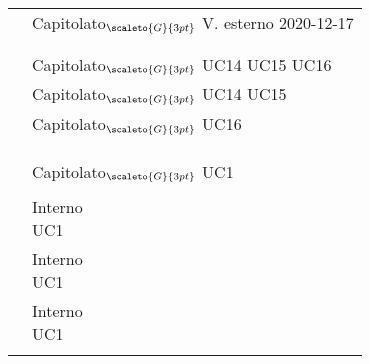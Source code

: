 {{{{\def\tabularxcolumn#1{m{#1}}
{
	\begin{center}
		\renewcommand{\arraystretch}{1.4}
		\begin{longtable}{|p{7.5cm}|p{7.5cm}|}
		\hline
		\rowcolor{airforceblue}
		\makecell[tc]{\textbf{Codice RS}} & \makecell[c]{\textbf{Fonte}}  \\
		\hline
		\makecell[tc]{RSFO1} & \makecell[tc]{Capitolato$_{\scaleto{G}{3pt}}$\\V. esterno 2020-12-17} \\
		\hline
		\makecell[tc]{RSFF2} & \makecell[tc]{Capitolato$_{\scaleto{G}{3pt}}$}\\
		\hline
		\makecell[tc]{RSFO3} & \makecell[tc]{UC2}\\
		\hline
		\makecell[tc]{RSFO4} & \makecell[tc]{Capitolato$_{\scaleto{G}{3pt}}$\\UC14\\UC15\\ UC16}\\
		\hline
		\makecell[tc]{RSFO4.1} & \makecell[tc]{Capitolato$_{\scaleto{G}{3pt}}$\\UC14 \\ UC15}\\
		\hline
		\makecell[tc]{RSFO4.2} & \makecell[tc]{Capitolato$_{\scaleto{G}{3pt}}$\\UC16}\\
		\hline
		\makecell[tc]{RSFO5} & \makecell[tc]{Capitolato$_{\scaleto{G}{3pt}}$}\\
		\hline
		\makecell[tc]{RSFD5.1} & \makecell[tc]{Capitolato$_{\scaleto{G}{3pt}}$}\\
		\hline
		\makecell[tc]{RSFD6}& \makecell[tc]{Capitolato$_{\scaleto{G}{3pt}}$}\\
		\hline
		\makecell[tc]{RSFO7} & \makecell[tc]{Capitolato$_{\scaleto{G}{3pt}}$\\UC1}\\
		\hline
		\makecell[tc]{RSFO8} & \makecell[tc]{Interno}\\
		\hline
		\makecell[tc]{RSFO9} & \makecell[tc]{Interno \\ UC1}\\
		\hline
		\makecell[tc]{RSFO10} & \makecell[tc]{Interno \\ UC1}\\
		\hline
		\makecell[tc]{RSFO11} & \makecell[tc]{Interno \\ UC1}\\
		\hline
		\makecell[tc]{RSFF12} & \makecell[tc]{Interno}\\

\end{longtable}
\end{center}}}}}}
